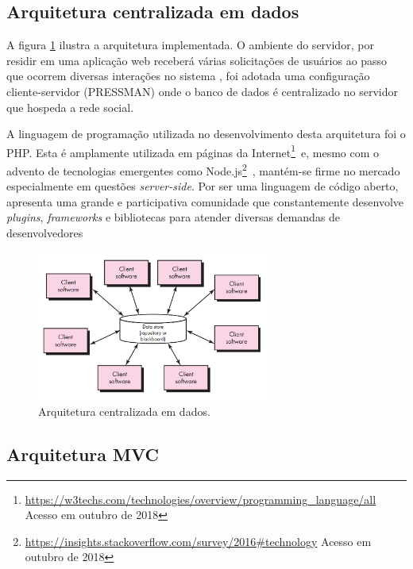 \documentclass[cic,tc]{iiufrgs}
\begin{document}
\subsection{Arquitetura centralizada em dados}
\label{arquiteturaCentralizadaDados}
A figura \ref{dataCenteredArchitecture} ilustra a arquitetura implementada. O ambiente do servidor, por residir em uma aplicação web receberá várias solicitações de usuários ao passo que ocorrem diversas interações no sistema \cite{kurose}, foi adotada uma configuração cliente-servidor (PRESSMAN) onde o banco de dados é centralizado no servidor que hospeda a rede social.

A linguagem de programação utilizada no desenvolvimento desta arquitetura foi o PHP. Esta é amplamente utilizada em páginas da Internet\footnote{\url{https://w3techs.com/technologies/overview/programming_language/all} Acesso em outubro de 2018}~e, mesmo com o advento de tecnologias emergentes como Node.js\footnote{\url{https://insights.stackoverflow.com/survey/2016\#technology} Acesso em outubro de 2018}~, mantém-se firme no mercado especialmente em questões \textit{server-side}. Por ser uma linguagem de código aberto, apresenta uma grande e participativa comunidade que constantemente desenvolve \textit{plugins}, \textit{frameworks} e bibliotecas para atender diversas demandas de desenvolvedores \cite{phpPatternsArticle2016}

\begin{figure}[ht]
    \caption{Arquitetura centralizada em dados.}
       	\begin{center}
            \includegraphics[width=0.68\textwidth]{arquitetura-centralizada-dados.png}
        \end{center}
    \label{dataCenteredArchitecture}
\end{figure}

\subsection{Arquitetura MVC}
\label{arquiteturaMVC}
\end{document}
